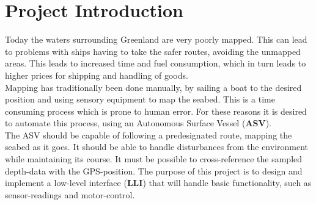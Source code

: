

\chapter{Project Introduction}
Today the waters surrounding Greenland are very poorly mapped. This can lead to problems with ships having to take the safer routes, avoiding the unmapped areas. This leads to increased time and fuel consumption, which in turn leads to higher prices for shipping and handling of goods.\\
Mapping has traditionally been done manually, by sailing a boat to the desired position and using sensory equipment to map the seabed. This is a time consuming process which is prone to human error. For these reasons it is desired to automate this process, using an Autonomous Surface Vessel (\textbf{ASV}).\\
The ASV should be capable of following a predesignated route, mapping the seabed as it goes. It should be able to handle disturbances from the environment while maintaining its course. It must be possible to cross-reference the sampled depth-data with the GPS-position.
The purpose of this project is to design and implement a low-level interface (\textbf{LLI}) that will handle basic functionality, such as sensor-readings and motor-control.



